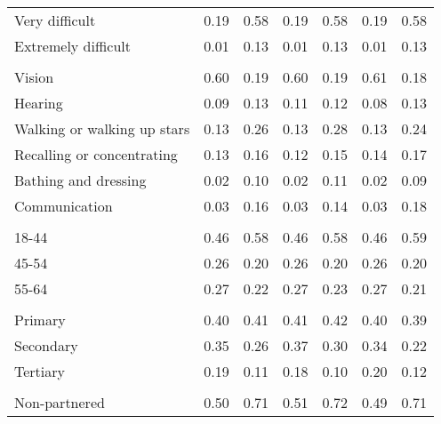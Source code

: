 \documentclass[
]{article}
\begin{document}
\begin{landscape}
\begin{table}
\begin{tabular}[t]{lcccccc}
\hspace{1em}Very difficult & 0.19 & 0.58 & 0.19 & 0.58 & 0.19 & 0.58\\
\hspace{1em}Extremely difficult & 0.01 & 0.13 & 0.01 & 0.13 & 0.01 & 0.13\\
\addlinespace[0.4em]
\multicolumn{7}{l}{\textit{Type of disability}}\\
\hspace{1em}Vision & 0.60 & 0.19 & 0.60 & 0.19 & 0.61 & 0.18\\
\hspace{1em}Hearing & 0.09 & 0.13 & 0.11 & 0.12 & 0.08 & 0.13\\
\hspace{1em}Walking or walking up stars & 0.13 & 0.26 & 0.13 & 0.28 & 0.13 & 0.24\\
\hspace{1em}Recalling or concentrating & 0.13 & 0.16 & 0.12 & 0.15 & 0.14 & 0.17\\
\hspace{1em}Bathing and dressing & 0.02 & 0.10 & 0.02 & 0.11 & 0.02 & 0.09\\
\hspace{1em}Communication & 0.03 & 0.16 & 0.03 & 0.14 & 0.03 & 0.18\\
\addlinespace[0.4em]
\multicolumn{7}{l}{\textit{Age}}\\
\hspace{1em}18-44 & 0.46 & 0.58 & 0.46 & 0.58 & 0.46 & 0.59\\
\hspace{1em}45-54 & 0.26 & 0.20 & 0.26 & 0.20 & 0.26 & 0.20\\
\hspace{1em}55-64 & 0.27 & 0.22 & 0.27 & 0.23 & 0.27 & 0.21\\
\addlinespace[0.6em]
\multicolumn{7}{l}{\textit{Education}}\\
\hspace{1em}Primary & 0.40 & 0.41 & 0.41 & 0.42 & 0.40 & 0.39\\
\hspace{1em}Secondary & 0.35 & 0.26 & 0.37 & 0.30 & 0.34 & 0.22\\
\hspace{1em}Tertiary & 0.19 & 0.11 & 0.18 & 0.10 & 0.20 & 0.12\\
\addlinespace[0.4em]
\multicolumn{7}{l}{\textit{Marital status}}\\
\hspace{1em}Non-partnered & 0.50 & 0.71 & 0.51 & 0.72 & 0.49 & 0.71\\

\end{tabular}
\end{table}
\end{landscape}
\end{document}
